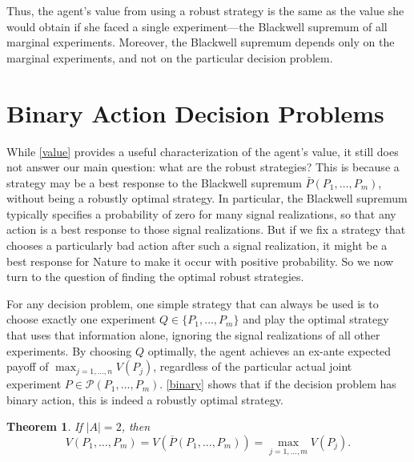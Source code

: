 \documentclass[11pt]{article}
\theoremstyle{plain}
\newtheorem{thm}{Theorem}
\theoremstyle{remark}
\begin{document}
Thus, the agent's value from using a robust strategy is the same as the value she would obtain if she faced a single experiment---the Blackwell supremum of all marginal experiments. Moreover, the Blackwell supremum depends only on the marginal experiments, and not on the particular decision problem.


\section{Binary Action Decision Problems}\label{sec:binarybinary}




While \autoref{value} provides a useful characterization of the agent's value, it still does not answer our main question: what are the robust strategies? This is because a strategy may be a best response to the Blackwell supremum $\bar{P}(P_1, \ldots , P_m)$, without being a robustly optimal strategy. In particular, the Blackwell supremum typically specifies a probability of zero for many signal realizations, so that any action is a best response to those signal realizations. But if we fix a strategy that chooses a particularly bad action after such a signal realization, it might be a best response for Nature to make it occur with positive probability. So we now turn to the question of finding the optimal robust strategies.  

 

For any decision problem, one simple strategy that can always be used is to choose exactly one experiment $Q \in \{P_1, \ldots ,P_m\}$ and play the optimal strategy that uses that information alone, ignoring the signal realizations of all other experiments. By choosing $Q$ optimally, the agent achieves an ex-ante expected payoff of $\max_{j = 1, \ldots , n} V(P_j)$, regardless of the particular actual joint experiment $P \in \mathcal{P}(P_1, \ldots , P_m)$.  \autoref{binary} shows that if the decision problem has binary action, this is indeed a robustly optimal strategy.

\begin{thm}\label{binary}
    If $|A| = 2$, then 
    \[
    V(P_1, \ldots , P_m) = V(\overline{P}(P_1, \ldots , P_m)) =  \max_{j = 1, \ldots , m}V(P_j).
    \]
\end{thm}
\end{document}

